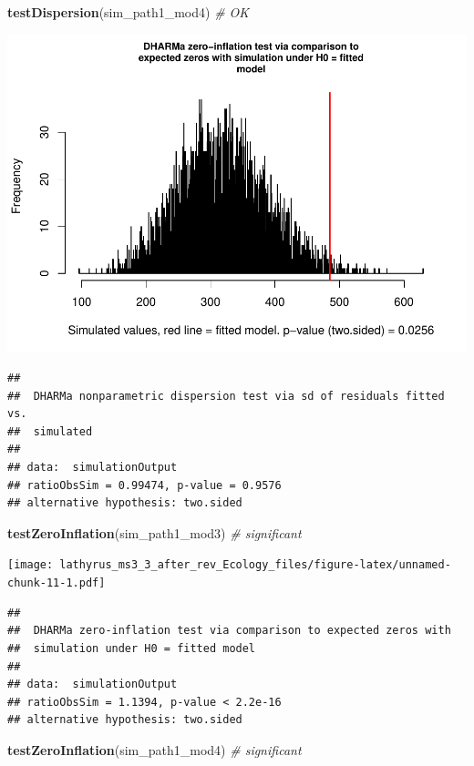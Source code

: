 \documentclass[
]{article}
\newenvironment{Shaded}{\begin{snugshade}}{\end{snugshade}}
\newcommand{\CommentTok}[1]{\textcolor[rgb]{0.56,0.35,0.01}{\textit{#1}}}
\newcommand{\KeywordTok}[1]{\textcolor[rgb]{0.13,0.29,0.53}{\textbf{#1}}}
\newcommand{\NormalTok}[1]{#1}
\begin{document}
\begin{Shaded}
\begin{Highlighting}[]
\KeywordTok{testDispersion}\NormalTok{(sim\_path1\_mod4) }\CommentTok{\# OK}
\end{Highlighting}
\end{Shaded}

\includegraphics{lathyrus_ms3_3_after_rev_Ecology_files/figure-latex/unnamed-chunk-10-2.pdf}

\begin{verbatim}
## 
##  DHARMa nonparametric dispersion test via sd of residuals fitted vs.
##  simulated
## 
## data:  simulationOutput
## ratioObsSim = 0.99474, p-value = 0.9576
## alternative hypothesis: two.sided
\end{verbatim}

\begin{Shaded}
\begin{Highlighting}[]
\KeywordTok{testZeroInflation}\NormalTok{(sim\_path1\_mod3) }\CommentTok{\# significant}
\end{Highlighting}
\end{Shaded}

\texttt{[image: lathyrus\_ms3\_3\_after\_rev\_Ecology\_files/figure-latex/unnamed-chunk-11-1.pdf]}

\begin{verbatim}
## 
##  DHARMa zero-inflation test via comparison to expected zeros with
##  simulation under H0 = fitted model
## 
## data:  simulationOutput
## ratioObsSim = 1.1394, p-value < 2.2e-16
## alternative hypothesis: two.sided
\end{verbatim}

\begin{Shaded}
\begin{Highlighting}[]
\KeywordTok{testZeroInflation}\NormalTok{(sim\_path1\_mod4) }\CommentTok{\# significant}
\end{Highlighting}
\end{Shaded}
\end{document}
